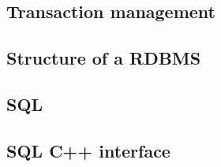 \subsection{Transaction management}
\label{sec:trans-manag}

\subsection{Structure of a RDBMS}
\label{sec:structure-rdbms}

\subsection{SQL}
\label{sec:sql}

\subsection{SQL C++ interface}
\label{sec:sql-c++-interface}





